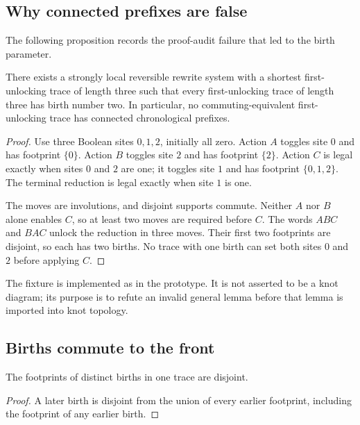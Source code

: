 \subsection{Why connected prefixes are false}

The following proposition records the proof-audit failure that led to the birth
parameter.

\begin{proposition}
\label{prop:branching-obstruction}
There exists a strongly local reversible rewrite system with a shortest
first-unlocking trace of length three such that every first-unlocking trace of
length three has birth number two.  In particular, no commuting-equivalent
first-unlocking trace has connected chronological prefixes.
\end{proposition}

\begin{proof}
Use three Boolean sites $0,1,2$, initially all zero.  Action $A$ toggles site
$0$ and has footprint $\{0\}$.  Action $B$ toggles site $2$ and has footprint
$\{2\}$.  Action $C$ is legal exactly when sites $0$ and $2$ are one; it toggles
site $1$ and has footprint $\{0,1,2\}$.  The terminal reduction is legal exactly
when site $1$ is one.

The moves are involutions, and disjoint supports commute.  Neither $A$ nor $B$
alone enables $C$, so at least two moves are required before $C$.  The words
$ABC$ and $BAC$ unlock the reduction in three moves.  Their first two footprints
are disjoint, so each has two births.  No trace with one birth can set both sites
$0$ and $2$ before applying $C$.
\end{proof}

The fixture is implemented as  in the prototype.  It
is not asserted to be a knot diagram; its purpose is to refute an invalid
general lemma before that lemma is imported into knot topology.

\subsection{Births commute to the front}

\begin{lemma}
\label{lem:birth-disjoint}
The footprints of distinct births in one trace are disjoint.
\end{lemma}

\begin{proof}
A later birth is disjoint from the union of every earlier footprint, including
the footprint of any earlier birth.
\end{proof}

